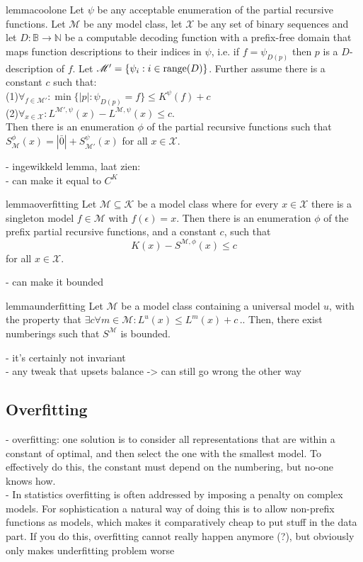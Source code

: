 \documentclass{style/llncs}
\newcommand{\M}{\mathscr M}
\newcommand{\K}{\mathscr K}
\newcommand{\X}{\mathscr X}
\newcommand{\B}{\mathbb B}
\newcommand{\N}{\mathbb N}
\newcommand{\tn}[1]{\textnormal{#1}}
\newcommand{\s}{S}
\newcommand{\p}{\,\text{.}}
\begin{document}
 


\begin{restatable}{lemma}{coolone}
\label{lemma:thecoolone}
  Let $\psi$ be any acceptable enumeration of the partial recursive functions.
  Let $\M$ be any model class, let $\X$ be any set of binary sequences and let $D:\B\to\N$ be a computable decoding function with a prefix-free domain that maps function descriptions to their indices in $\psi$, i.e. if $f=\psi_{D(p)}$ then $p$ is a $D$-description of $f$. Let $\M'=\{\psi_i:i\in\tn{range}(D)\}$. Further assume there is a constant $c$ such that:\\
\-\hspace{1cm}(1)$\forall_{f\in\M'}:\min\{|p|:\psi_{D(p)}=f\}\le K^\psi(f)+c$\\
\-\hspace{1cm}(2)$\forall_{x\in\X}:L^{\M',\psi}(x)-L^{\M,\psi}(x)\le c$.\\
Then there is an enumeration $\phi$ of the partial recursive functions such that $S^\phi_{\M}(x) = |\bar 0|+S^\psi_{\M'}(x)$ for all $x\in\X$.
\end{restatable}

- ingewikkeld lemma, laat zien:\\
- can make it equal to $C^K$
\begin{restatable}[Overfitting]{lemma}{overfitting}
Let $\M \subseteq \K$ be a model class where for every $x\in\X$ there is a singleton model $f\in\M$ with $f(\epsilon)=x$. Then there is an enumeration $\phi$ of the prefix partial recursive functions, and a constant $c$, such that
\[
K(x)-S^{\M,\phi}(x)\le c
\]
for all $x\in\X$.
\end{restatable}

- can make it bounded
\begin{restatable}[underfitting]{lemma}{underfitting}
Let $\M$ be a model class containing a universal model $u$, with the property that $\exists c \forall m \in \M : L^u(x) \leq L^m(x) + c \p$. Then, there exist numberings such that $\s^\M$ is bounded.
\end{restatable}

- it's certainly not invariant \\
- any tweak that upsets balance -> can still go wrong the other way

\subsection{Overfitting}

- overfitting: one solution is to consider all representations that are within a constant of optimal, and then select the one with the smallest model. To effectively do this, the constant must depend on the numbering, but no-one knows how. \\
- In statistics overfitting is often addressed by imposing a penalty on complex models. For sophistication a natural way of doing this is to allow non-prefix functions as models, which makes it comparatively cheap to put stuff in the data part. If you do this, overfitting cannot really happen anymore (?), but obviously only makes underfitting problem worse
\end{document}
